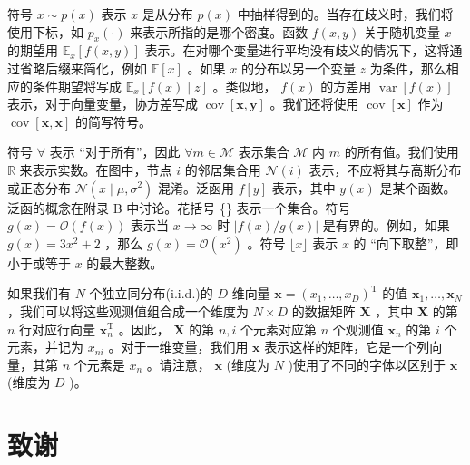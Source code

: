 \documentclass[10pt]{report}
\begin{document}
符号 \(x \sim  p\left( x\right)\) 表示 \(x\) 是从分布 \(p\left( x\right)\) 中抽样得到的。当存在歧义时，我们将使用下标，如 \({p}_{x}\left( \cdot \right)\) 来表示所指的是哪个密度。函数 \(f\left( {x,y}\right)\) 关于随机变量 \(x\) 的期望用 \({\mathbb{E}}_{x}\left\lbrack  {f\left( {x,y}\right) }\right\rbrack\) 表示。在对哪个变量进行平均没有歧义的情况下，这将通过省略后缀来简化，例如 \(\mathbb{E}\left\lbrack  x\right\rbrack\) 。如果 \(x\) 的分布以另一个变量 \(z\) 为条件，那么相应的条件期望将写成 \({\mathbb{E}}_{x}\left\lbrack  {f\left( x\right)  \mid  z}\right\rbrack\) 。类似地， \(f\left( x\right)\) 的方差用 \(\operatorname{var}\left\lbrack  {f\left( x\right) }\right\rbrack\) 表示，对于向量变量，协方差写成 \(\operatorname{cov}\left\lbrack  {\mathbf{x},\mathbf{y}}\right\rbrack\) 。我们还将使用 \(\operatorname{cov}\left\lbrack  \mathbf{x}\right\rbrack\) 作为 \(\operatorname{cov}\left\lbrack  {\mathbf{x},\mathbf{x}}\right\rbrack\) 的简写符号。

符号 \(\forall\) 表示 “对于所有”，因此 \(\forall m \in  \mathcal{M}\) 表示集合 \(\mathcal{M}\) 内 \(m\) 的所有值。我们使用 \(\mathbb{R}\) 来表示实数。在图中，节点 \(i\) 的邻居集合用 \(\mathcal{N}\left( i\right)\) 表示，不应将其与高斯分布或正态分布 \(\mathcal{N}\left( {x \mid  \mu ,{\sigma }^{2}}\right)\) 混淆。泛函用 \(f\left\lbrack  y\right\rbrack\) 表示，其中 \(y\left( x\right)\) 是某个函数。泛函的概念在附录 B 中讨论。花括号 \{\} 表示一个集合。符号 \(g\left( x\right)  = \mathcal{O}\left( {f\left( x\right) }\right)\) 表示当 \(x \rightarrow  \infty\) 时 \(\left| {f\left( x\right) /g\left( x\right) }\right|\) 是有界的。例如，如果 \(g\left( x\right)  = 3{x}^{2} + 2\) ，那么 \(g\left( x\right)  = \mathcal{O}\left( {x}^{2}\right)\) 。符号 \(\lfloor x\rfloor\) 表示 \(x\) 的 “向下取整”，即小于或等于 \(x\) 的最大整数。

如果我们有 \(N\) 个独立同分布(i.i.d.)的 \(D\) 维向量 \(\mathbf{x} = {\left( {x}_{1},\ldots ,{x}_{D}\right) }^{\mathrm{T}}\) 的值 \({\mathbf{x}}_{1},\ldots ,{\mathbf{x}}_{N}\) ，我们可以将这些观测值组合成一个维度为 \(N \times  D\) 的数据矩阵 \(\mathbf{X}\) ，其中 \(\mathbf{X}\) 的第 \(n\) 行对应行向量 \({\mathbf{x}}_{n}^{\mathrm{T}}\) 。因此， \(\mathbf{X}\) 的第 \(n,i\) 个元素对应第 \(n\) 个观测值 \({\mathbf{x}}_{n}\) 的第 \(i\) 个元素，并记为 \({x}_{ni}\) 。对于一维变量，我们用 \(\mathbf{x}\) 表示这样的矩阵，它是一个列向量，其第 \(n\) 个元素是 \({x}_{n}\) 。请注意， \(\mathbf{x}\) (维度为 \(N\) )使用了不同的字体以区别于 \(\mathbf{x}\) (维度为 \(D\) )。

\section*{致谢}
\end{document}
